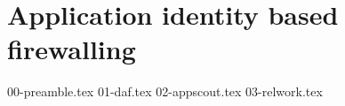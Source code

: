 \chapter{Application identity based firewalling}
\label{appfw:chapter}

{00-preamble.tex}
{01-daf.tex}
{02-appscout.tex}
{03-relwork.tex}

